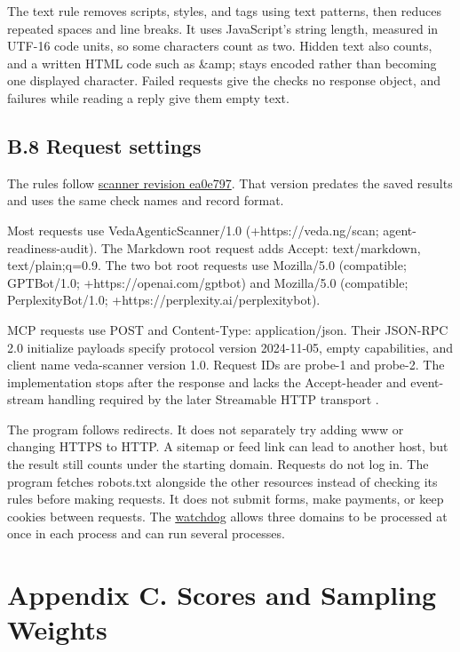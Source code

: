 \documentclass{article}
\begin{document}
The text rule removes scripts, styles, and tags using text patterns, then reduces repeated spaces and line breaks. It uses JavaScript's string length, measured in UTF-16 code units, so some characters count as two. Hidden text also counts, and a written HTML code such as \&amp; stays encoded rather than becoming one displayed character. Failed requests give the checks no response object, and failures while reading a reply give them empty text.

\subsection*{B.8 Request settings}

The rules follow \href{https://github.com/vedangvatsa/vedang-website/commit/ea0e797ecc13e494968500db03f128679f05b92b}{scanner revision ea0e797}. That version predates the saved results and uses the same check names and record format.

Most requests use VedaAgenticScanner/1.0 (+https://veda.ng/scan; agent-readiness-audit). The Markdown root request adds Accept: text/markdown, text/plain;q=0.9. The two bot root requests use Mozilla/5.0 (compatible; GPTBot/1.0; +https://openai.com/gptbot) and Mozilla/5.0 (compatible; PerplexityBot/1.0; +https://perplexity.ai/perplexitybot).

MCP requests use POST and Content-Type: application/json. Their JSON-RPC 2.0 initialize payloads specify protocol version 2024-11-05, empty capabilities, and client name veda-scanner version 1.0. Request IDs are probe-1 and probe-2. The implementation stops after the response and lacks the Accept-header and event-stream handling required by the later Streamable HTTP transport \cite{ref30}.

The program follows redirects. It does not separately try adding www or changing HTTPS to HTTP. A sitemap or feed link can lead to another host, but the result still counts under the starting domain. Requests do not log in. The program fetches robots.txt alongside the other resources instead of checking its rules before making requests. It does not submit forms, make payments, or keep cookies between requests. The \href{https://github.com/vedangvatsa/vedang-website/blob/af35d3c49de6f8a9b8352d334875db748cae7d8f/scripts/scan-watchdog.sh}{watchdog} allows three domains to be processed at once in each process and can run several processes.

\section*{Appendix C. Scores and Sampling Weights}
\end{document}
